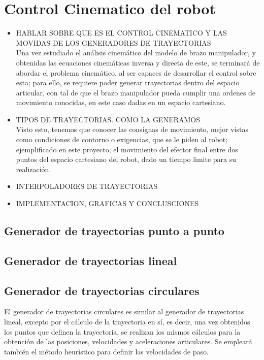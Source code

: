 \section{Control Cinematico del robot}
\begin{itemize}
	\item HABLAR SOBRE QUE ES EL CONTROL CINEMATICO Y LAS MOVIDAS DE LOS GENERADORES DE TRAYECTORIAS
\\Una vez estudiado el análisis cinemático del modelo de brazo manipulador, y obtenidas las ecuaciones cinemáticas inversa y directa de este, se terminará de abordar el problema cinemático, al ser capaces de desarrollar el control sobre esta; para ello, se requiere poder generar trayectorias dentro del espacio articular, con tal de que el brazo manipulador pueda cumplir una ordenes de movimiento conocidas, en este caso dadas en un espacio cartesiano.\\

\item TIPOS DE TRAYECTORIAS. COMO LA GENERAMOS
\\Visto esto, tenemos que conocer las consignas de movimiento, mejor vistas como condiciones de contorno o exigencias, que se le piden al robot; ejemplificado en este proyecto, el movimiento del efector final entre dos puntos del espacio cartesiano del robot, dado un tiempo limite para su realización.\\

	\item INTERPOLADORES DE TRAYECTORIAS
	\item IMPLEMENTACION, GRAFICAS Y CONCLUSCIONES
\end{itemize}
	\subsection{Generador de trayectorias punto a punto}

	\subsection{Generador de trayectorias lineal}

	\subsection{Generador de trayectorias circulares}
	El generador de trayectorias circulares es similar al generador de trayectorias lineal, excepto por el cálculo de la trayectoria en sí, es decir, una vez obtenidos los puntos que definen la trayectoria, se realizan los mismos cálculos para la obtención de las posiciones, velocidades y aceleraciones articulares. Se empleará también el método heurístico para definir las velocidades de paso.\\

